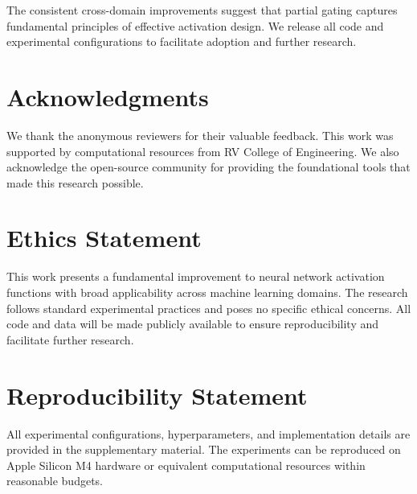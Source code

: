 \documentclass[11pt]{article}
\begin{document}
The consistent cross-domain improvements suggest that partial gating captures fundamental principles of effective activation design. We release all code and experimental configurations to facilitate adoption and further research.

\section*{Acknowledgments}

We thank the anonymous reviewers for their valuable feedback. This work was supported by computational resources from RV College of Engineering. We also acknowledge the open-source community for providing the foundational tools that made this research possible.

\section*{Ethics Statement}

This work presents a fundamental improvement to neural network activation functions with broad applicability across machine learning domains. The research follows standard experimental practices and poses no specific ethical concerns. All code and data will be made publicly available to ensure reproducibility and facilitate further research.

\section*{Reproducibility Statement}

All experimental configurations, hyperparameters, and implementation details are provided in the supplementary material. The experiments can be reproduced on Apple Silicon M4 hardware or equivalent computational resources within reasonable budgets.
\end{document}
